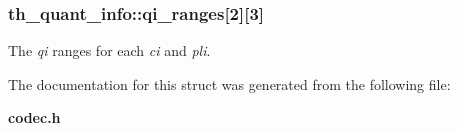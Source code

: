 \subsubsection[{qi\-\_\-ranges}]{ th\-\_\-quant\-\_\-info\-::qi\-\_\-ranges[2][3]}\label{structth__quant__info_a6feacf4b365e305a7df7b93d87ee7bb8}


The {\itshape qi} ranges for each {\itshape ci} and {\itshape pli}. 



The documentation for this struct was generated from the following file\-:\begin{DoxyCompactItemize}
\item 
{\bf codec.\-h}\end{DoxyCompactItemize}
